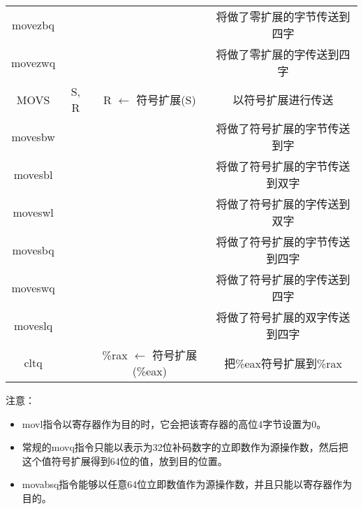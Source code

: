 \begin{table}[H]
\begin{tabular}{|c c|c|c|}
        movezbq                           &             &                                & 将做了零扩展的字节传送到四字   \\
        movezwq                           &             &                                & 将做了零扩展的字传送到四字    \\
        \hline
        MOVS                              & S, R        & R $\leftarrow$ 符号扩展(S)         & 以符号扩展进行传送        \\
        \hline
        movesbw                           &             &                                & 将做了符号扩展的字节传送到字   \\
        movesbl                           &             &                                & 将做了符号扩展的字节传送到双字  \\
        moveswl                           &             &                                & 将做了符号扩展的字传送到双字   \\
        movesbq                           &             &                                & 将做了符号扩展的字节传送到四字  \\
        moveswq                           &             &                                & 将做了符号扩展的字传送到四字   \\
        moveslq                           &             &                                & 将做了符号扩展的双字传送到四字  \\
        cltq                              &             & \%rax $\leftarrow$ 符号扩展(\%eax) & 把\%eax符号扩展到\%rax \\
        \hline
    \end{tabular}
\end{table}

注意：
\begin{itemize}
    \item movl指令以寄存器作为目的时，它会把该寄存器的高位4字节设置为0。
    \item 常规的movq指令只能以表示为32位补码数字的立即数作为源操作数，然后把这个值符号扩展得到64位的值，放到目的位置。
    \item movabsq指令能够以任意64位立即数值作为源操作数，并且只能以寄存器作为目的。
\end{itemize}
